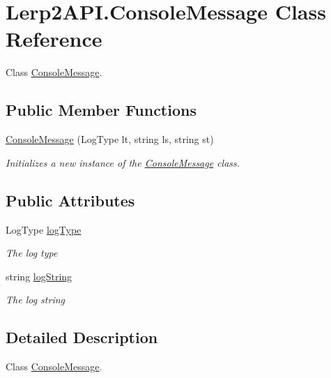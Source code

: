 \hypertarget{class_lerp2_a_p_i_1_1_console_message}{}\section{Lerp2\+A\+P\+I.\+Console\+Message Class Reference}
\label{class_lerp2_a_p_i_1_1_console_message}


Class \hyperlink{class_lerp2_a_p_i_1_1_console_message}{Console\+Message}.  


\subsection*{Public Member Functions}
\begin{DoxyCompactItemize}
\item 
\hyperlink{class_lerp2_a_p_i_1_1_console_message_ac57e022f2521be063cace8b4e8fce45e}{Console\+Message} (Log\+Type lt, string ls, string st)
\begin{DoxyCompactList}\small\item\em Initializes a new instance of the \hyperlink{class_lerp2_a_p_i_1_1_console_message}{Console\+Message} class. \end{DoxyCompactList}\end{DoxyCompactItemize}
\subsection*{Public Attributes}
\begin{DoxyCompactItemize}
\item 
Log\+Type \hyperlink{class_lerp2_a_p_i_1_1_console_message_aaf16aa394b7815ab52670581601339d3}{log\+Type}
\begin{DoxyCompactList}\small\item\em The log type \end{DoxyCompactList}\item 
string \hyperlink{class_lerp2_a_p_i_1_1_console_message_a4c1c6779c94fbd0ff785931fb6e20045}{log\+String}
\begin{DoxyCompactList}\small\item\em The log string \end{DoxyCompactList}\end{DoxyCompactItemize}


\subsection{Detailed Description}
Class \hyperlink{class_lerp2_a_p_i_1_1_console_message}{Console\+Message}. 



